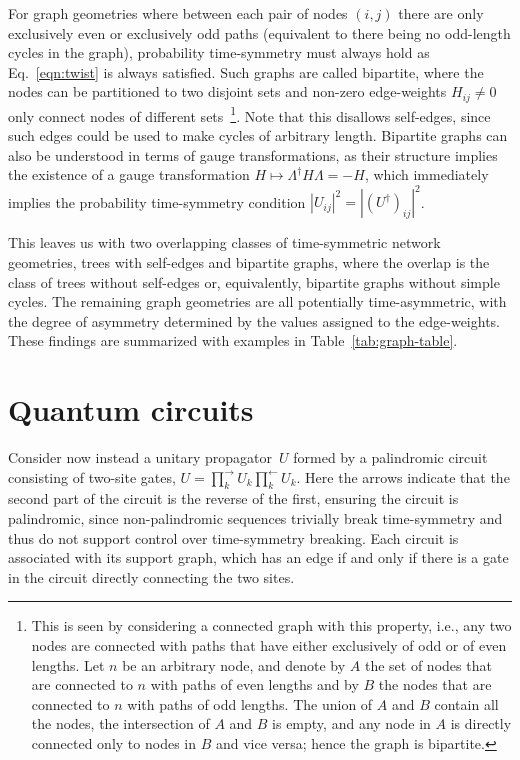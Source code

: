 \documentclass[aps,prx,10pt,
               superscriptaddress,
               twocolumn,
               longbibliography,
showpacs]{revtex4-1}
\theoremstyle{plain}
\theoremstyle{definition}
\newcommand{\ind}[1]{_{#1}}  %
\begin{document}
For graph geometries where between each pair of nodes $(i, j)$ there are only
exclusively
even or exclusively odd paths
(equivalent to there being no odd-length cycles in the graph),
probability time-symmetry must always hold as Eq.~\eqref{eqn:twist} is always
satisfied. Such graphs are called
bipartite, where the nodes can be partitioned to two disjoint
sets and non-zero edge-weights
$H_{ij} \neq 0$ only connect nodes of different sets~\footnote{
This is seen by considering a connected graph with
this property, i.e., any two nodes are
connected with paths that have either exclusively of odd or of even lengths.
Let $n$ be an arbitrary node, and denote by $A$ the set of nodes
that are connected to $n$ with paths of even lengths and by $B$ the nodes
that are connected to $n$ with paths of odd lengths.
The union of $A$ and $B$ contain all the nodes, the intersection of
$A$ and $B$ is empty, and any node in $A$ is directly connected only to nodes
in $B$ and vice versa; hence the graph is bipartite.}. Note that this disallows
self-edges, since such edges could be used to make cycles of arbitrary length.
Bipartite graphs can also be understood in terms of gauge transformations, as their structure implies the
existence of a gauge transformation
$H \mapsto \Lambda^{\dagger} H \Lambda = -H$, which immediately implies the probability time-symmetry
condition $|U_{ij}|^2 = | ( U^\dagger )_{ij}|^2$.

This leaves us with two overlapping classes of time-symmetric network
geometries, trees with self-edges and bipartite graphs, where the overlap is the
class of trees without self-edges or, equivalently, bipartite graphs without
simple cycles.
The remaining graph geometries are all potentially
time-asymmetric, with the degree of asymmetry determined by the values assigned
to the edge-weights. These findings are summarized with examples in
Table~\ref{tab:graph-table}.

\section{Quantum circuits}
Consider now instead a unitary propagator~$U$ formed by a palindromic circuit
consisting of two-site gates,
$U = \prod\ind{k}^\rightarrow U\ind{k} \prod\ind{k}^\leftarrow U\ind{k}$.
Here the arrows indicate that the second part of the circuit is the reverse of the first,
ensuring the circuit is palindromic, since non-palindromic sequences trivially break time-symmetry and thus do not support control over time-symmetry breaking.
Each circuit is associated with its support graph, which has an edge if and only if
there is a gate in the circuit directly connecting the two sites.
\end{document}
